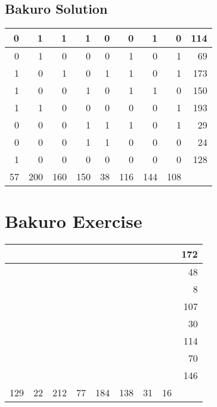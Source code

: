 \documentclass[]{article}
\begin{document}
 \subsection{Bakuro Solution} 
\begin{tabular}{rrrrrrrrr}
\hline
  0 &   1 &   1 &   1 &  0 &   0 &   1 &   0 & 114 \\ \hline
  0 &   1 &   0 &   0 &  0 &   1 &   0 &   1 &  69 \\ \hline
  1 &   0 &   1 &   0 &  1 &   1 &   0 &   1 & 173 \\ \hline
  1 &   0 &   0 &   1 &  0 &   1 &   1 &   0 & 150 \\ \hline
  1 &   1 &   0 &   0 &  0 &   0 &   0 &   1 & 193 \\ \hline
  0 &   0 &   0 &   1 &  1 &   1 &   0 &   1 &  29 \\ \hline
  0 &   0 &   0 &   1 &  1 &   0 &   0 &   0 &  24 \\ \hline
  1 &   0 &   0 &   0 &  0 &   0 &   0 &   0 & 128 \\ \hline
 57 & 200 & 160 & 150 & 38 & 116 & 144 & 108 &     \\ \hline
\hline
\end{tabular}\newpage\section{Bakuro Exercise}\begin{tabular}{rrrrrrrrr}
\hline
     &    &     &    &     &     &    &    & 172 \\ \hline
     &    &     &    &     &     &    &    &  48 \\ \hline
     &    &     &    &     &     &    &    &   8 \\ \hline
     &    &     &    &     &     &    &    & 107 \\ \hline
     &    &     &    &     &     &    &    &  30 \\ \hline
     &    &     &    &     &     &    &    & 114 \\ \hline
     &    &     &    &     &     &    &    &  70 \\ \hline
     &    &     &    &     &     &    &    & 146 \\ \hline
 129 & 22 & 212 & 77 & 184 & 138 & 31 & 16 &     \\ \hline
\hline
\end{tabular}\newpage 
\end{document}
